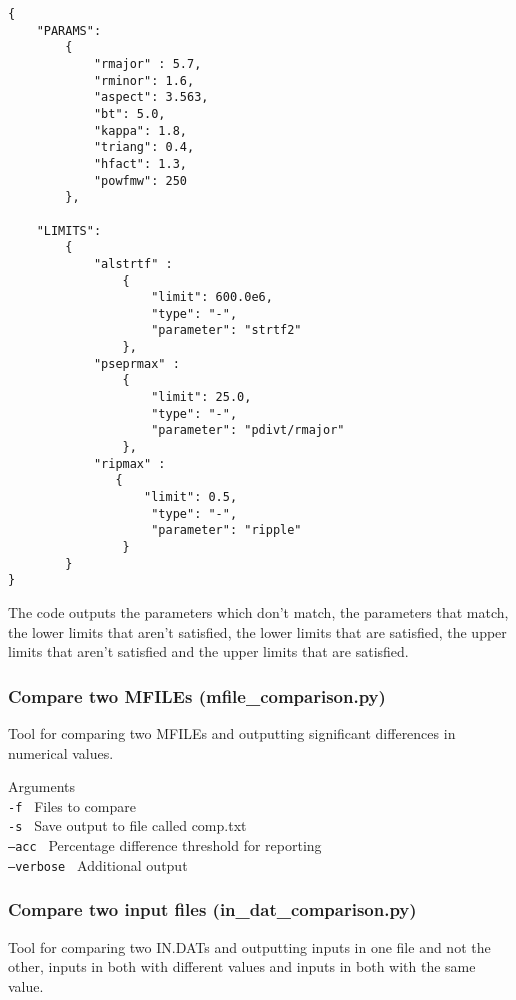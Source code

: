 \documentclass[11pt,a4paper]{article}
\begin{document}
\begin{framed}
\begin{verbatim}
{
	"PARAMS":
        {
            "rmajor" : 5.7,
            "rminor": 1.6,
            "aspect": 3.563,
            "bt": 5.0,
            "kappa": 1.8,
            "triang": 0.4,
            "hfact": 1.3,
            "powfmw": 250
        },

    "LIMITS":
        {
            "alstrtf" :
                {
                    "limit": 600.0e6,
                    "type": "-",
                    "parameter": "strtf2"
                },
            "pseprmax" :
                {
                    "limit": 25.0,
                    "type": "-",
                    "parameter": "pdivt/rmajor"
                },
            "ripmax" :
               {
                   "limit": 0.5,
                    "type": "-",
                    "parameter": "ripple"
                }
        }
}
\end{verbatim}
\end{framed}

The code outputs the parameters which don't match, the parameters that match, the
lower limits that aren't satisfied, the lower limits that are satisfied, the upper
limits that aren't satisfied and the upper limits that are satisfied.

\subsubsection{Compare two MFILEs (mfile\_comparison.py)}
Tool for comparing two MFILEs and outputting significant differences in numerical values.

Arguments\\
\texttt{-f        }     Files to compare\\
\texttt{-s        }     Save output to file called comp.txt\\
\texttt{--acc     }     Percentage difference threshold for reporting\\
\texttt{--verbose }     Additional output\\


\subsubsection{Compare two input files (in\_dat\_comparison.py)}
Tool for comparing two IN.DATs and outputting inputs in one file and not the other,
inputs in both with different values and inputs in both with the same value.
\end{document}
